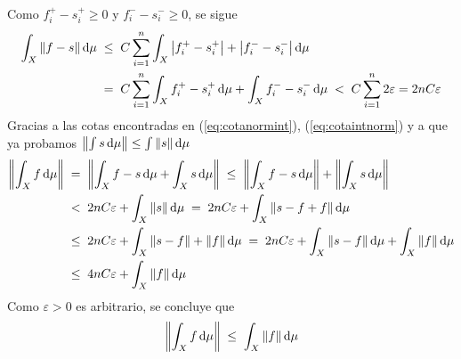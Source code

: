 \begin{sol}
\begin{align*}
\end{align*}
Como $f^+_i - s^+_i \ge 0$ y $f^-_i - s^-_i \ge 0$, se sigue
\begin{equation}\label{eq:cotaintnorm}
\begin{split}
\int_X \norm{f-s} \dd{\mu}
&\;\leq\; C\sum^n_{i=1} \int_X \abs{f^+_i-s^+_i} + \abs{f^-_i - s^-_i} \dd{\mu}\\
&\;=\; C\sum^n_{i=1} \int_X {f^+_i-s^+_i} \dd{\mu} + \int_X {f^-_i - s^-_i} \dd{\mu}
\;<\; C \sum^n_{i=1} 2\varepsilon = 2nC\varepsilon
\end{split}
\end{equation}
Gracias a las cotas encontradas en (\ref{eq:cotanormint}), (\ref{eq:cotaintnorm}) y a que ya probamos $\norm{\int s \dd{\mu}} \le \int \norm{s} \dd{\mu}$ 
\begin{align*}
\norm{\int_X f \dd{\mu}}
&\;=\; \norm{\int_X f-s \dd{\mu} + \int_X s \dd{\mu}}
\;\leq\; \norm{\int_X f-s \dd{\mu}} + \norm{\int_X s \dd{\mu}}\\
&\;<\; 2nC\varepsilon + \int_X \norm{s} \dd{\mu}
\;=\; 2nC\varepsilon + \int_X \norm{s-f + f} \dd{\mu}\\
&\;\leq\; 2nC\varepsilon + \int_X \norm{s-f} + \norm{f} \dd{\mu}
\;=\; 2nC\varepsilon + \int_X \norm{s-f} \dd{\mu} + \int_X \norm{f} \dd{\mu}\\
&\;\leq\; 4nC\varepsilon + \int_X \norm{f} \dd{\mu}
\end{align*}
Como $\varepsilon>0$ es arbitrario, se concluye que
\[
\norm{\int_X f \dd{\mu}} \;\leq\; \int_X \norm{f} \dd{\mu}
\]
\end{sol}
